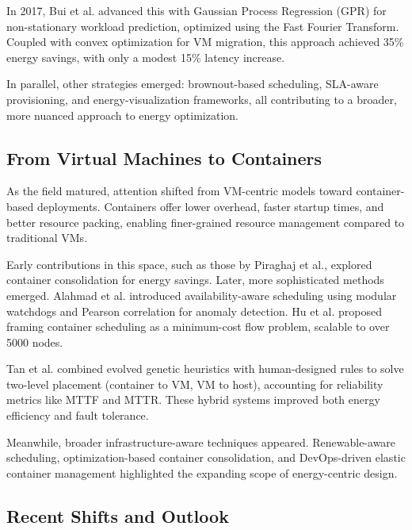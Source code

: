 \documentclass[runningheads]{llncs}
\begin{document}
In 2017, Bui et al.\cite{bui_energy_2017} advanced this with Gaussian Process Regression (GPR) for non-stationary workload prediction, optimized using the Fast Fourier Transform. Coupled with convex optimization for VM migration, this approach achieved 35\% energy savings, with only a modest 15\% latency increase. 

In parallel, other strategies emerged: brownout-based scheduling\cite{xu_energy_2016}, SLA-aware provisioning\cite{li_sla-aware_2018}, and energy-visualization frameworks, all contributing to a broader, more nuanced approach to energy optimization\cite{carrega_energy-aware_2017, hameed_survey_2016}.

\subsection{From Virtual Machines to Containers}

As the field matured, attention shifted from VM-centric models toward container-based deployments. Containers offer lower overhead, faster startup times, and better resource packing, enabling finer-grained resource management compared to traditional VMs\cite{alahmad_availability-aware_2018}.

Early contributions in this space, such as those by Piraghaj et al.\cite{piraghaj_framework_2015}, explored container consolidation for energy savings. Later, more sophisticated methods emerged. Alahmad et al.\cite{alahmad_availability-aware_2018} introduced availability-aware scheduling using modular watchdogs and Pearson correlation for anomaly detection. Hu et al.\cite{hu_concurrent_2020} proposed framing container scheduling as a minimum-cost flow problem, scalable to over 5000 nodes.

Tan et al.\cite{tan_hybrid_2019} combined evolved genetic heuristics with human-designed rules to solve two-level placement (container to VM, VM to host), accounting for reliability metrics like MTTF and MTTR. These hybrid systems improved both energy efficiency and fault tolerance.

Meanwhile, broader infrastructure-aware techniques appeared. Renewable-aware scheduling\cite{kumar_renewable_2019}, optimization-based container consolidation\cite{shi_energy-aware_2018}, and DevOps-driven elastic container management\cite{barna_delivering_2017} highlighted the expanding scope of energy-centric design.

\subsection{Recent Shifts and Outlook}
\end{document}
